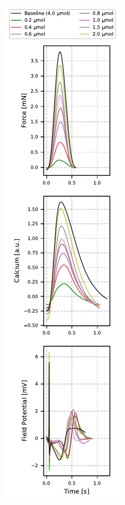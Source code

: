 \documentclass{report}
\begin{document}
\begin{figure}[h]
\begin{subfigure}[b]{0.3\textwidth}
                    \caption[Nifedipine average contraction]{}
                    \label{fig:nifedipine-average}
                \end{subfigure}
                ~
                \begin{subfigure}[b]{0.34\textwidth}
                    \includegraphics[width=\textwidth, height=0.927\textheight]{plots/chapter_3/average_signals_ca_titration.pdf}

\end{subfigure}
\end{figure}
\end{document}
